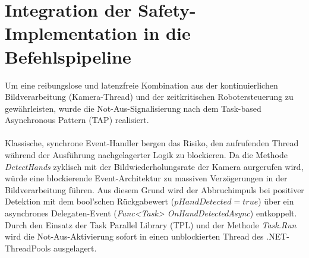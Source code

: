 \section{Integration der Safety-Implementation in die Befehlspipeline}
\label{kap:Integration der Safety-Implementation in die Befehlspipeline}
Um eine reibungslose und latenzfreie Kombination aus der kontinuierlichen Bildverarbeitung (Kamera-Thread) und der zeitkritischen Robotersteuerung zu gewährleisten, wurde die Not-Aus-Signalisierung nach dem Task-based Asynchronous Pattern (TAP) realisiert.\\
\\Klassische, synchrone Event-Handler bergen das Risiko, den aufrufenden Thread während der Ausführung nachgelagerter Logik zu blockieren. Da die Methode \textit{DetectHands} zyklisch mit der Bildwiederholungsrate der Kamera aurgerufen wird, würde eine blockierende Event-Architektur zu massiven Verzögerungen in der Bildverarbeitung führen. Aus diesem Grund wird der Abbruchimpuls bei positiver Detektion mit dem bool'schen Rückgabewert ($pHandDetected = true$) über ein asynchrones Delegaten-Event (\textit{Func<Task> OnHandDetectedAsync}) entkoppelt. Durch den Einsatz der Task Parallel Library (TPL) und der Methode \textit{Task.Run} wird die Not-Aus-Aktivierung sofort in einen unblockierten Thread des .NET-ThreadPools ausgelagert.

